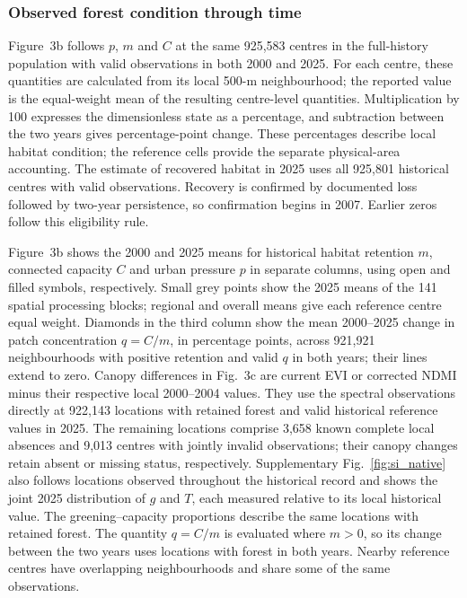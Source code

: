 \subsubsection{Observed forest condition through time}
Figure~3b follows $p$, $m$ and $C$ at the same 925,583 centres in the full-history population with valid observations in both 2000 and 2025. For each centre, these quantities are calculated from its local 500-m neighbourhood; the reported value is the equal-weight mean of the resulting centre-level quantities. Multiplication by 100 expresses the dimensionless state as a percentage, and subtraction between the two years gives percentage-point change. These percentages describe local habitat condition; the reference cells provide the separate physical-area accounting. The estimate of recovered habitat in 2025 uses all 925,801 historical centres with valid observations. Recovery is confirmed by documented loss followed by two-year persistence, so confirmation begins in 2007. Earlier zeros follow this eligibility rule.

Figure~3b shows the 2000 and 2025 means for historical habitat retention $m$, connected capacity $C$ and urban pressure $p$ in separate columns, using open and filled symbols, respectively. Small grey points show the 2025 means of the 141 spatial processing blocks; regional and overall means give each reference centre equal weight. Diamonds in the third column show the mean 2000--2025 change in patch concentration $q=C/m$, in percentage points, across 921,921 neighbourhoods with positive retention and valid $q$ in both years; their lines extend to zero. Canopy differences in Fig.~3c are current EVI or corrected NDMI minus their respective local 2000--2004 values. They use the spectral observations directly at 922,143 locations with retained forest and valid historical reference values in 2025. The remaining locations comprise 3,658 known complete local absences and 9,013 centres with jointly invalid observations; their canopy changes retain absent or missing status, respectively. Supplementary Fig.~\ref{fig:si_native} also follows locations observed throughout the historical record and shows the joint 2025 distribution of $g$ and $T$, each measured relative to its local historical value. The greening--capacity proportions describe the same locations with retained forest. The quantity $q=C/m$ is evaluated where $m>0$, so its change between the two years uses locations with forest in both years. Nearby reference centres have overlapping neighbourhoods and share some of the same observations.

